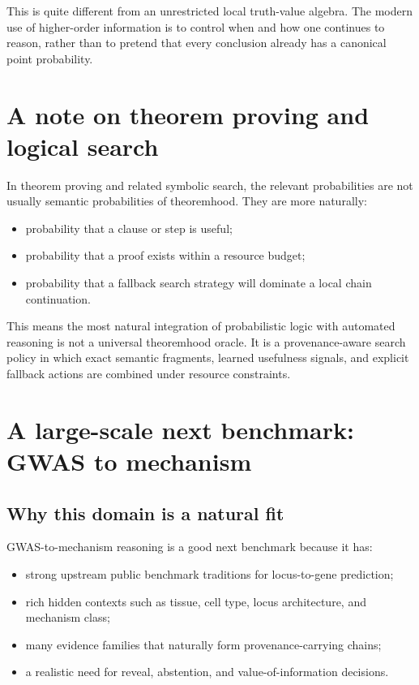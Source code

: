 \documentclass[11pt]{article}
\begin{document}
This is quite different from an unrestricted local truth-value algebra. The modern use of higher-order information is to control when and how one continues to reason, rather than to pretend that every conclusion already has a canonical point probability.

\section{A note on theorem proving and logical search}
In theorem proving and related symbolic search, the relevant probabilities are not usually semantic probabilities of theoremhood. They are more naturally:
\begin{itemize}
    \item probability that a clause or step is useful;
    \item probability that a proof exists within a resource budget;
    \item probability that a fallback search strategy will dominate a local chain continuation.
\end{itemize}

This means the most natural integration of probabilistic logic with automated reasoning is not a universal theoremhood oracle. It is a provenance-aware search policy in which exact semantic fragments, learned usefulness signals, and explicit fallback actions are combined under resource constraints.

\section{A large-scale next benchmark: GWAS to mechanism}
\subsection{Why this domain is a natural fit}
GWAS-to-mechanism reasoning is a good next benchmark because it has:
\begin{itemize}
    \item strong upstream public benchmark traditions for locus-to-gene prediction;
    \item rich hidden contexts such as tissue, cell type, locus architecture, and mechanism class;
    \item many evidence families that naturally form provenance-carrying chains;
    \item a realistic need for reveal, abstention, and value-of-information decisions.
\end{itemize}
\end{document}
